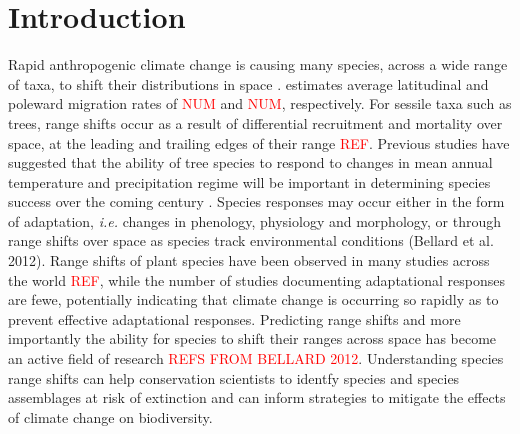 \documentclass[a4paper,11pt]{article}
\newcommand{\todo}[1]{\textcolor{red}{#1}}   %
\begin{document}
\section*{Introduction}
Rapid anthropogenic climate change is causing many species, across a wide range of taxa, to shift their distributions in space \citep{Hughes2000, Parmesan2006, Chen2011}. \citet{Chen2011} estimates average latitudinal and poleward migration rates of \todo{NUM} and \todo{NUM}, respectively. For sessile taxa such as trees, range shifts occur as a result of differential recruitment and mortality over space, at the leading and trailing edges of their range \todo{REF}. Previous studies have suggested that the ability of tree species to respond to changes in mean annual temperature and precipitation regime will be important in determining species success over the coming century \citep{Colwell2008, Chen2011, Feeley2012}. Species responses may occur either in the form of adaptation, \textit{i.e.} changes in phenology, physiology and morphology, or through range shifts over space as species track environmental conditions (Bellard et al. 2012). Range shifts of plant species have been observed in many studies across the world \todo{REF}, while the number of studies documenting adaptational responses are fewe, potentially indicating that climate change is occurring so rapidly as to prevent effective adaptational responses. Predicting range shifts and more importantly the ability for species to shift their ranges across space has become an active field of research \todo{REFS FROM BELLARD 2012}. Understanding species range shifts can help conservation scientists to identfy species and species assemblages at risk of extinction and can inform strategies to mitigate the effects of climate change on biodiversity. 
\end{document}
